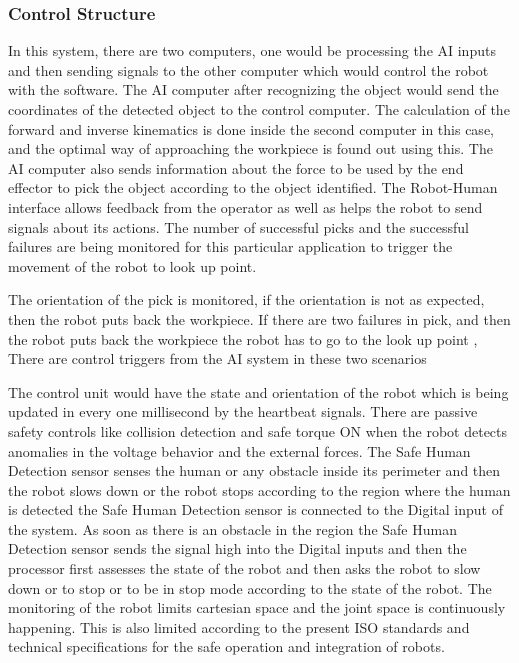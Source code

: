{ \subsubsection{Control Structure}

In this system, there are two computers, one would be processing the AI inputs and then sending signals to the other computer which would control the robot with the software. The AI computer after recognizing the object would send the coordinates of the detected object to the control computer. The calculation of the forward and inverse kinematics is done inside the second computer in this case, and the optimal way of approaching the workpiece is found out using this.
The AI computer also sends information about the force to be used by the end effector to pick the object according to the object identified. The Robot-Human interface allows feedback from the operator as well as helps the robot to send signals about its actions.
The number of successful picks and the successful failures are being monitored for this particular application to trigger the movement of the robot to look up point.

The orientation of the pick is monitored, if the orientation is not as expected, then the robot puts back the workpiece. If there are two failures in pick, and then the robot puts back the workpiece the robot has to go to the look up point , There are control triggers from the AI system in these two scenarios

The control unit would have the state and orientation of the robot which is being updated in every one millisecond by the heartbeat signals.
There are passive safety controls like collision detection and safe torque ON when the robot detects anomalies in the voltage behavior and the external forces.
The Safe Human Detection sensor senses the human or any obstacle inside its perimeter and then the robot slows down or the robot stops according to the region where the human is detected the Safe Human Detection sensor is connected to the Digital input of the system. 
As soon as there is an obstacle in the region the Safe Human Detection sensor sends the signal high into the Digital inputs and then the processor first assesses the state of the robot and then asks the robot to slow down or to stop or to be in stop mode according to the state of the robot. 
The monitoring of the robot limits cartesian space and the joint space is continuously happening. This is also limited according to the present ISO standards and technical specifications for the safe operation and integration of robots.





}
